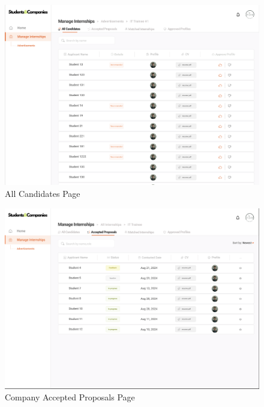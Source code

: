 \documentclass{article}
\begin{document}
\begin{figure}[H]
    \centering
    \includegraphics[scale = 0.42]{figures/UserInterfaces/Company/AllCandidatesCompany.png}
    \caption{All Candidates Page}
     \centering
\end{figure}
\begin{figure}[H]
    \centering
    \includegraphics[scale = 0.42]{figures/UserInterfaces/Company/AcceptedProposalCompany.png}
    \caption{Company Accepted Proposals Page}
     \centering
\end{figure}
\end{document}
